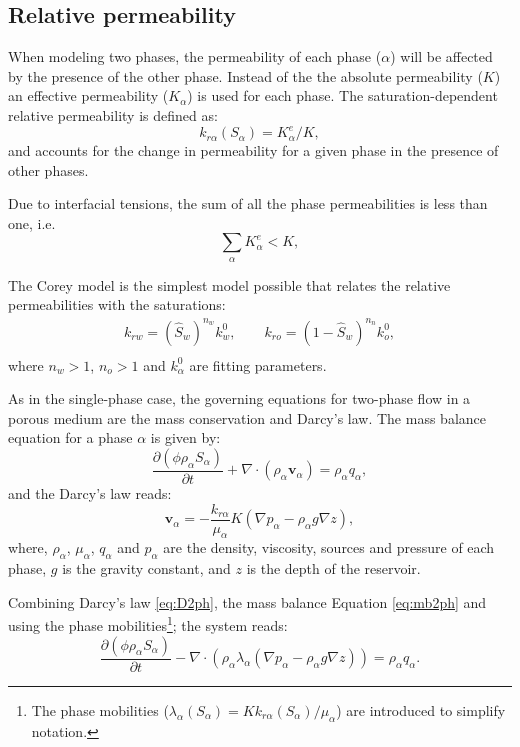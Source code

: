 \documentclass{article}
\begin{document}
\subsection*{Relative permeability}
\hspace{0.5cm}When modeling two phases, the permeability of each phase ($\alpha$) will be affected by the presence of the other phase. Instead of the the absolute permeability ($K$) an effective permeability ($K_\alpha$) is used for each phase. 
The saturation-dependent relative permeability is defined as:
$$k_{r\alpha}(S_{\alpha})=K_{\alpha}^e/K,$$
and accounts for the change in permeability for a given phase in the presence of other phases.\par
Due to interfacial tensions, the sum of all the phase permeabilities is less than one, i.e.
$$\sum_{\alpha}K_{\alpha}^e<K,$$

The Corey model is the simplest model possible that relates the relative permeabilities with the saturations:
\begin{equation}\label{eq:Corey}
\begin{aligned}
k_{rw}=(\hat{S}_w)^{n_w}k_w^0,\qquad
k_{ro}=(1-\hat{S}_w)^{n_n}k_o^0,\\
\end{aligned}
\end{equation}
where $n_w>1$, $n_o>1$ and $k_{\alpha}^0$ are fitting parameters.\par
As in the single-phase case, the governing equations for two-phase flow in a porous medium are the mass conservation and Darcy's law. 
The mass balance equation for a phase $\alpha$ is given by:
\begin{equation}\label{eq:mb2ph}
 \frac{\partial(\phi \rho_{\alpha}S_{\alpha})}{\partial t}+\nabla \cdot ( \rho_{\alpha} \mathbf{v}_{\alpha})=\rho_{\alpha} q_{\alpha},
\end{equation}
and the Darcy's law reads:
\begin{equation}\label{eq:D2ph}
\mathbf{v}_{\alpha}=-\frac{k_{r\alpha}}{\mu_{\alpha}} {K}(\nabla p_{\alpha}-\rho_{\alpha} g \nabla z),
\end{equation}
where, $\rho_{\alpha}$, $\mu_{\alpha}$, $q_{\alpha}$ and $p_{\alpha}$ are the density, 
viscosity, sources and pressure of each phase, $g$ is the gravity constant, and $z$ is the 
depth of the reservoir.   \par
Combining Darcy's law \eqref{eq:D2ph}, the mass balance Equation \eqref{eq:mb2ph} and using the phase mobilities\footnote{The phase mobilities ($\lambda_{\alpha}(S_{\alpha})=Kk_{r\alpha}(S_{\alpha})/\mu_{\alpha}$) are introduced to simplify notation.}; the system reads:
\begin{equation}\label{eq:2ph}
 \frac{\partial(\phi \rho_{\alpha}S_{\alpha})}{\partial t}-\nabla \cdot ( \rho_{\alpha} \lambda_{\alpha}(\nabla p_{\alpha}-\rho_{\alpha} g \nabla z))=\rho_{\alpha} q_{\alpha}.
\end{equation}
\end{document}
